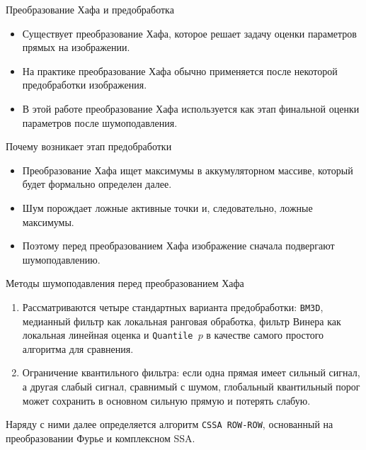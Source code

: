 \documentclass[unicode,notheorems]{beamer}
\begin{document}
\begin{frame}{Преобразование Хафа и предобработка}
	\begin{itemize}
		\item Существует преобразование Хафа, которое решает задачу оценки параметров прямых на изображении.
		\item На практике преобразование Хафа обычно применяется после некоторой предобработки изображения.
		\item В этой работе преобразование Хафа используется как этап финальной оценки параметров после шумоподавления.
	\end{itemize}

	\vspace{0.25cm}
	\begin{block}{Почему возникает этап предобработки}
		\begin{itemize}
			\item Преобразование Хафа ищет максимумы в аккумуляторном массиве, который будет формально определен далее.
			\item Шум порождает ложные активные точки и, следовательно, ложные максимумы.
			\item Поэтому перед преобразованием Хафа изображение сначала подвергают шумоподавлению.
		\end{itemize}
	\end{block}
\end{frame}

\begin{frame}{Методы шумоподавления перед преобразованием Хафа}
	\small
	\begin{enumerate}
		\item Рассматриваются четыре стандартных варианта предобработки: \texttt{BM3D}, медианный фильтр как локальная ранговая обработка, фильтр Винера как локальная линейная оценка и \texttt{Quantile $p$} в качестве самого простого алгоритма для сравнения.
		\item Ограничение квантильного фильтра: если одна прямая имеет сильный сигнал, а другая слабый сигнал, сравнимый с шумом, глобальный квантильный порог может сохранить в основном сильную прямую и потерять слабую.
	\end{enumerate}

	\vspace{0.2cm}
	Наряду с ними далее определяется алгоритм \texttt{CSSA ROW-ROW}, основанный на преобразовании Фурье и комплексном SSA.
\end{frame}
\end{document}
